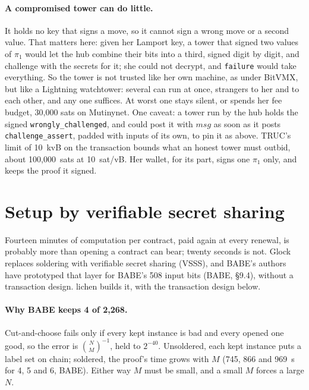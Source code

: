 \documentclass[11pt]{article}
\newcommand{\tx}[1]{\texttt{#1}}
\begin{document}
\paragraph{A compromised tower can do little.} It holds no key that
signs a move, so it cannot sign a wrong move or a second value. That
matters here: given her Lamport key, a tower that signed two values of
$\pi_1$ would let the hub combine their bits into a third, signed digit
by digit, and challenge with the secrets for it; she could not decrypt,
and \tx{failure} would take everything. So the tower is not trusted like
her own machine, as under BitVMX, but like a Lightning watchtower:
several can run at once, strangers to her and to each other, and any one
suffices. At worst one stays silent, or spends her fee budget, 30,000
sats on Mutinynet. One caveat: a tower run by the hub holds the signed
\tx{wrongly\_challenged}, and could post it with $\mathit{msg}$ as soon
as it posts \tx{challenge\_assert}, padded with inputs of its own, to
pin it as above. TRUC's limit of 10~kvB on the transaction bounds what
an honest tower must outbid, about 100,000~sats at 10~sat/vB. Her
wallet, for its part, signs one $\pi_1$ only, and keeps the proof it
signed.

\section{Setup by verifiable secret sharing}
\label{sec:vsss}

Fourteen minutes of computation per contract, paid again at every
renewal, is probably more than opening a contract can bear; twenty
seconds is not. Glock~\cite{glock} replaces soldering with verifiable
secret sharing (VSSS), and BABE's authors have prototyped that layer for
BABE's 508 input bits (BABE, §9.4), without a transaction design. lichen
builds it, with the transaction design below.

\paragraph{Why BABE keeps 4 of 2,268.} Cut-and-choose fails only if
every kept instance is bad and every opened one good, so the error is
$\binom{N}{M}^{-1}$, held to $2^{-40}$. Unsoldered, each kept instance
puts a label set on chain; soldered, the proof's time grows with $M$
(745, 866 and 969~s for 4, 5 and 6, BABE). Either way $M$ must be small,
and a small $M$ forces a large $N$.
\end{document}
